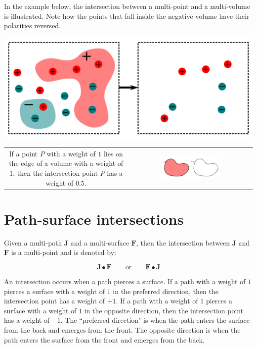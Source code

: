 \documentclass{book}
\begin{document}
In the example below, the intersection between a multi-point and a multi-volume is illustrated. Note how the points that fall inside the negative volume have their polarities reversed. 

\begin{center}
\includegraphics[scale = 0.4]{Intersections/Point-volume_intersections/point_volume_intersections_two_panel_example}
\end{center}

\begin{tabular}{cc}
\parbox{0.5\textwidth}{
If a point \(P\) with a weight of \(1\) lies on the edge of a volume with a weight of \(1\), then the intersection point \(P\) has a weight of \(0.5\).
} & \parbox{0.5\textwidth}{
\includegraphics[width = 0.5\textwidth]{Intersections/Point-volume_intersections/point_volume_intersection_boundary_case}
}
\end{tabular}





\section{Path-surface intersections}

Given a multi-path \(\mathbf{J}\) and a multi-surface \(\mathbf{F}\), then the intersection between \(\mathbf{J}\) and \(\mathbf{F}\) is a multi-point and is denoted by:

\[\mathbf{J} \bullet \mathbf{F} \quad\quad\text{or}\quad\quad \mathbf{F} \bullet \mathbf{J}\]

An intersection occurs when a path pierces a surface. If a path with a weight of \(1\) pierces a surface with a weight of \(1\) in the preferred direction, then the intersection point has a weight of \(+1\). If a path with a weight of \(1\) pierces a surface with a weight of \(1\) in the opposite direction, then the intersection point has a weight of \(-1\). The ``preferred direction" is when the path enters the surface from the back and emerges from the front. The opposite direction is when the path enters the surface from the front and emerges from the back.
\end{document}
